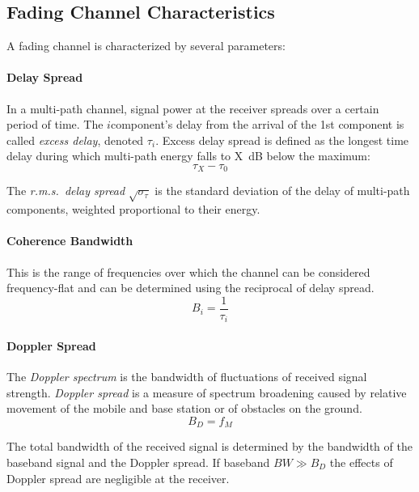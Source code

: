 \subsection{Fading Channel Characteristics}
A fading channel is characterized by several parameters:
\paragraph{Delay Spread} In a multi-path channel, signal power at the receiver spreads over a certain period of time. The \(i\)\nth component's delay from the arrival of the 1st component is called \emph{excess delay}, denoted \(\tau_i\)\cite{fuqin}. Excess delay spread is defined as the longest time delay during which multi-path energy falls to X~dB below the maximum:
\begin{equation}
	\tau_X - \tau_0
\end{equation}
\begin{mathDef}
\end{mathDef}
The \emph{r.m.s.~delay spread} \(\sqrt{\sigma_\tau}\) is the standard deviation of the delay of multi-path components, weighted proportional to their energy.
\paragraph{Coherence Bandwidth} This is the range of frequencies over which the channel can be considered frequency-flat\cite{Hindu} and can be determined using the reciprocal of delay spread\cite{Salehi}.
\begin{equation}
	B_i = \frac{1}{\tau_i}
\end{equation}
\paragraph{Doppler Spread}
The \emph{Doppler spectrum} is the bandwidth of fluctuations of received signal strength. \emph{Doppler spread} is a measure of spectrum broadening caused by relative movement of the mobile and base station or of obstacles on the ground.
\begin{equation}
	B_D = f_M
\end{equation}
\begin{mathDef}
\end{mathDef}
The total bandwidth of the received signal is determined by the bandwidth of the baseband signal and the Doppler spread. If baseband \(BW \gg B_D\) the effects of Doppler spread are negligible at the receiver.
